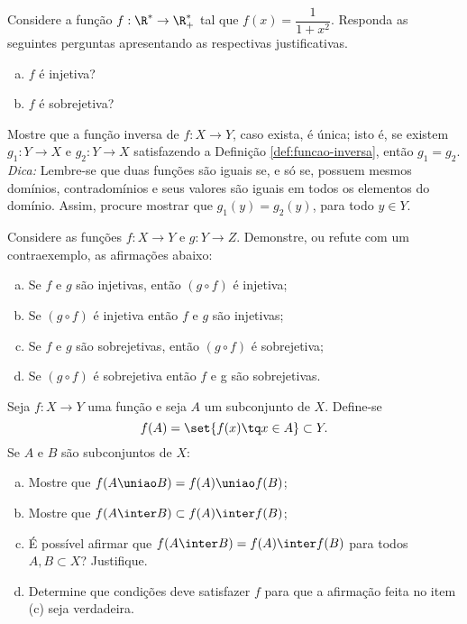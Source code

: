 \begin{exercise}
    Considere a função $f: \R^\ast \to \R^\ast_+$ tal que $f(x) = \dfrac{1}{1+x^2}$. Responda as seguintes perguntas apresentando as respectivas justificativas.
    \begin{enumerate}[a)]
        \item $f$ é injetiva?
	\item $f$ é sobrejetiva?
    \end{enumerate}
\end{exercise}

\begin{exercise}
Mostre que a função inversa de $f: X \to Y$, caso exista, é
única; isto é, se existem $g_1 : Y \to X$ e $g_2 : Y \to X$
satisfazendo a Definição \ref{def:funcao-inversa}, então $g_1 = g_2$.\\
\emph{Dica: } Lembre-se que duas funções são iguais se, e só se,
possuem mesmos domínios, contradomínios e seus valores são iguais em
todos os elementos do domínio. Assim, procure mostrar que $g_1 (y) =
g_2 (y)$, para todo $y \in Y$.
\end{exercise}

\begin{exercise}
  Considere as funções $f: X \to Y$ e $g: Y \to Z$. Demonstre, ou refute com um contraexemplo, as afirmações abaixo:
\begin{enumerate}[(a)]
\item Se $f$ e $g$ são injetivas, então $(g \circ f)$ é injetiva;
\item Se $(g \circ f)$ é injetiva então $f$ e $g$ são injetivas;
\item Se $f$ e $g$ são sobrejetivas, então $(g \circ f)$ é sobrejetiva;
\item Se $(g \circ f)$ é sobrejetiva então $f$ e g são sobrejetivas.
\end{enumerate}
\end{exercise}

\begin{exercise}
    Seja $f: X \to Y$ uma função e seja $A$ um subconjunto de $X$.
Define-se $$f(A) = \set{f(x) \tq x\in A} \subset Y.$$ Se $A$ e $B$
são subconjuntos de $X$:
\begin{enumerate}[(a)]
  \item Mostre que $f(A \uniao B) = f(A) \uniao f(B)$;
  \item Mostre que $f(A \inter B) \subset f(A) \inter f(B)$;
  \item É possível afirmar que $f(A \inter B) = f(A) \inter f(B)$ para
  todos $A, B \subset X$? Justifique.
  \item Determine que condições deve satisfazer $f$ para que a
  afirmação feita no item (c) seja verdadeira.
\end{enumerate}

\end{exercise}

